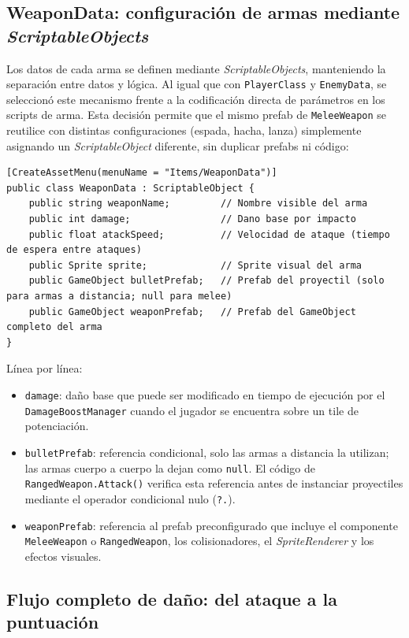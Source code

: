 \subsection{WeaponData: configuración de armas mediante \textit{ScriptableObjects}}


Los datos de cada arma se definen mediante \textit{ScriptableObjects}, manteniendo la separación entre datos y lógica. Al igual que con \texttt{PlayerClass} y \texttt{EnemyData}, se seleccionó este mecanismo frente a la codificación directa de parámetros en los scripts de arma. Esta decisión permite que el mismo prefab de \texttt{MeleeWeapon} se reutilice con distintas configuraciones (espada, hacha, lanza) simplemente asignando un \textit{ScriptableObject} diferente, sin duplicar prefabs ni código:

\begin{lstlisting}
[CreateAssetMenu(menuName = "Items/WeaponData")]
public class WeaponData : ScriptableObject {
    public string weaponName;         // Nombre visible del arma
    public int damage;                // Dano base por impacto
    public float atackSpeed;          // Velocidad de ataque (tiempo de espera entre ataques)
    public Sprite sprite;             // Sprite visual del arma
    public GameObject bulletPrefab;   // Prefab del proyectil (solo para armas a distancia; null para melee)
    public GameObject weaponPrefab;   // Prefab del GameObject completo del arma
}
\end{lstlisting}


Línea por línea:

\begin{itemize}
\item \texttt{damage}: daño base que puede ser modificado en tiempo de ejecución por el \texttt{DamageBoostManager} cuando el jugador se encuentra sobre un tile de potenciación.
\item \texttt{bulletPrefab}: referencia condicional, solo las armas a distancia la utilizan; las armas cuerpo a cuerpo la dejan como \texttt{null}. El código de \texttt{RangedWeapon.Attack()} verifica esta referencia antes de instanciar proyectiles mediante el operador condicional nulo (\texttt{?.}).
\item \texttt{weaponPrefab}: referencia al prefab preconfigurado que incluye el componente \texttt{MeleeWeapon} o \texttt{RangedWeapon}, los colisionadores, el \textit{SpriteRenderer} y los efectos visuales.
\end{itemize}

\subsection{Flujo completo de daño: del ataque a la puntuación}


